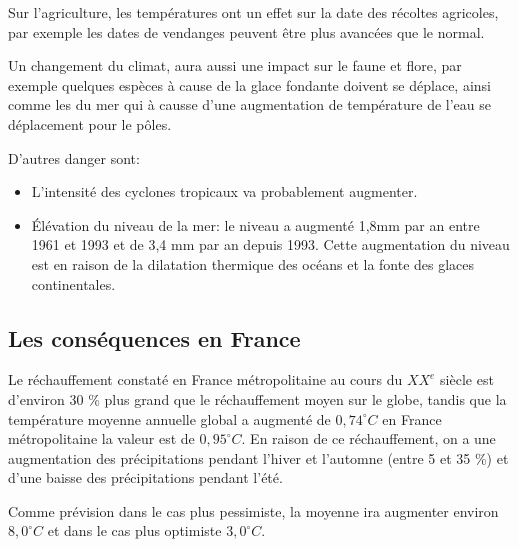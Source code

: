 \documentclass[a4paper,11pt]{article}
\begin{document}
Sur  l'agriculture, les  températures  ont un  effet  sur la  date des  récoltes
agricoles, par exemple les dates de vendanges peuvent être plus avancées que le normal.

Un  changement du  climat, aura  aussi une  impact sur  le faune  et  flore, par
exemple quelques espèces à cause de  la glace fondante doivent se déplace, ainsi
comme les  du mer  qui à causse  d'une augmentation  de température de  l'eau se
déplacement pour le pôles.

D'autres danger sont:
\begin{itemize}
\item L'intensité des cyclones tropicaux va probablement augmenter.
\item Élévation  du niveau de la  mer: le niveau  a augmenté 1,8mm par  an entre
  1961 et 1993 et de 3,4 mm par an depuis 1993. Cette augmentation du niveau est
  en raison de la dilatation thermique des océans et la fonte des glaces continentales.
\end{itemize}


\subsection{Les conséquences en France}


Le réchauffement constaté en France métropolitaine au cours du $XX^e$ siècle 
est d’environ 30  \% plus grand que le réchauffement moyen  sur le globe, tandis
que  la température  moyenne annuelle  global a  augmenté de  $0,74^{\circ}C$ en
France métropolitaine la valeur est de $0,95^{\circ}C$.%
En raison de ce réchauffement, on a une augmentation des précipitations
pendant l'hiver et l'automne (entre 5 et 35 \%) et d’une baisse des précipitations
pendant l'été.

Comme prévision dans le cas plus pessimiste,  la moyenne ira augmenter environ $8,0^{\circ}C$ et
dans le cas plus optimiste $3,0^{\circ}C$.

\end{document}
